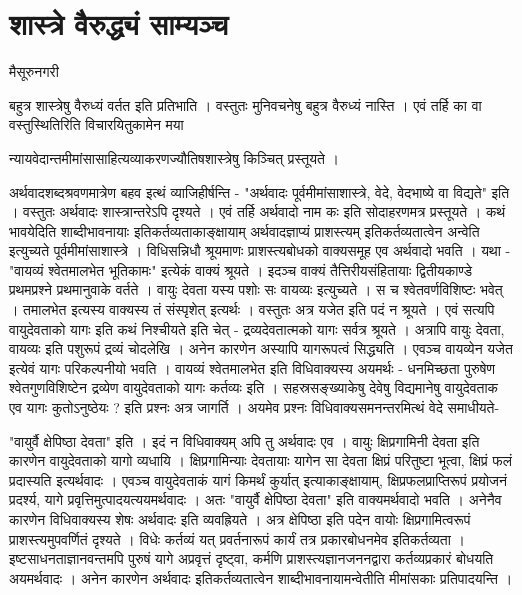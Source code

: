 \chapter{शास्त्रे वैरुद्ध्यं साम्यञ्च} 

\begin{center}
\smallskip

मैसूरुनगरी
\end{center}

बहुत्र शास्त्रेषु वैरुध्यं वर्तत इति प्रतिभाति । वस्तुतः मुनिवचनेषु बहुत्र वैरुध्यं नास्ति । एवं तर्हि का वा वस्तुस्थितिरिति विचारयितुकामेन मया  

न्यायवेदान्तमीमांसासाहित्यव्याकरणज्यौतिषशास्त्रेषु किञ्चित् प्रस्तूयते ।

अर्थवादशब्दश्रवणमात्रेण बहव इत्थं व्याजिहीर्षन्ति - "अर्थवादः पूर्वमीमांसाशास्त्रे, वेदे, वेदभाष्ये वा विद्यते" इति । वस्तुतः अर्थवादः शास्त्रान्तरेऽपि दृश्यते । एवं तर्हि अर्थवादो नाम कः इति सोदाहरणमत्र प्रस्तूयते । कथं भावयेदिति शाब्दीभावनायाः इतिकर्तव्यताकाङ्क्षायाम् अर्थवादज्ञाप्यं प्राशस्त्यम् इतिकर्तव्यतात्वेन अन्वेति इत्युच्यते पूर्वमीमांसाशास्त्रे । विधिसन्निधौ श्रूयमाणः प्राशस्त्यबोधको वाक्यसमूह एव अर्थवादो भवति । यथा - "वायव्यं श्वेतमालभेत भूतिकामः" इत्येकं वाक्यं श्रूयते । इदञ्च वाक्यं तैत्तिरीयसंहितायाः द्वितीयकाण्डे प्रथमप्रश्ने प्रथमानुवाके वर्तते । वायुः देवता यस्य पशोः सः वायव्यः इत्युच्यते । स च श्वेतवर्णविशिष्टः भवेत् । तमालभेत इत्यस्य वाक्यस्य तं संस्पृशेत् इत्यर्थः । वस्तुतः अत्र यजेत इति पदं न श्रूयते । एवं सत्यपि वायुदेवताको यागः इति कथं निश्चीयते इति चेत् - द्रव्यदेवतात्मको यागः सर्वत्र श्रूयते । अत्रापि वायुः देवता, वायव्यः इति पशुरूपं द्रव्यं चोदलेखि । अनेन कारणेन अस्यापि यागरूपत्वं सिद्ध्यति । एवञ्च वायव्येन यजेत इत्येवं यागः परिकल्पनीयो भवति । वायव्यं श्वेतमालभेत इति विधिवाक्यस्य अयमर्थः - धनमिच्छता पुरुषेण श्वेतगुणविशिष्टेन द्रव्येण वायुदेवताको यागः कर्तव्यः इति । सहस्रसङ्ख्याकेषु देवेषु विद्यमानेषु वायुदेवताक एव यागः कुतोऽनुष्ठेयः ? इति प्रश्नः अत्र जागर्ति । अयमेव प्रश्नः विधिवाक्यसमनन्तरमित्थं वेदे समाधीयते-

"वायुर्वै क्षेपिष्ठा देवता" इति । इदं न विधिवाक्यम् अपि तु अर्थवादः एव । वायुः क्षिप्रगामिनी देवता इति कारणेन वायुदेवताको यागो व्यधायि । क्षिप्रगामिन्याः देवतायाः यागेन सा देवता क्षिप्रं परितुष्टा भूत्वा, क्षिप्रं फलं प्रदास्यति इत्यर्थवादः । एवञ्च वायुदेवताकं यागं किमर्थं कुर्यात् इत्याकाङ्क्षायाम्, क्षिप्रफलप्राप्तिरूपं प्रयोजनं प्रदर्श्य, यागे प्रवृत्तिमुत्पादयत्ययमर्थवादः । अतः "वायुर्वै क्षेपिष्ठा देवता" इति वाक्यमर्थवादो भवति । अनेनैव कारणेन  विधिवाक्यस्य शेषः अर्थवादः इति व्यवह्रियते । अत्र क्षेपिष्ठा इति पदेन वायोः क्षिप्रगामित्वरूपं प्राशस्त्यमुपवर्णितं दृश्यते । विधेः कर्तव्यं यत् प्रवर्तनारूपं कार्यं तत्र प्रकारबोधनमेव इतिकर्तव्यता । इष्टसाधनताज्ञानवन्तमपि पुरुषं यागे अप्रवृत्तं दृष्ट्वा, कर्मणि प्राशस्त्यज्ञानजननद्वारा कर्तव्यप्रकारं बोधयति अयमर्थवादः । अनेन कारणेन अर्थवादः इतिकर्तव्यतात्वेन शाब्दीभावनायामन्वेतीति मीमांसकाः प्रतिपादयन्ति ।

